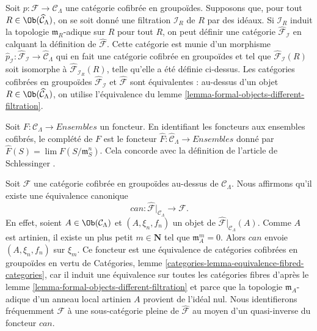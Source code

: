 \begin{remark}
\label{remark-different-sequence-ideals}
Soit $p : \mathcal{F} \to \mathcal{C}_\Lambda$ une catégorie cofibrée en
groupoïdes. Supposons que, pour tout
$R \in \Ob(\widehat{\mathcal{C}}_\Lambda)$, on se soit donné une filtration
$\mathcal{I}_R$ de $R$ par des idéaux. Si $\mathcal{I}_R$ induit la topologie
$\mathfrak m_R$-adique sur $R$ pour tout $R$, on peut définir une catégorie
$\widehat{\mathcal{F}}_\mathcal{I}$ en calquant la définition de
$\widehat{\mathcal{F}}$. Cette catégorie est munie d'un morphisme
$\widehat{p}_\mathcal{I} : \widehat{\mathcal{F}}_\mathcal{I} \to
\widehat{\mathcal{C}}_\Lambda$ qui en fait une catégorie cofibrée en
groupoïdes et tel que $\widehat{\mathcal{F}}_\mathcal{I}(R)$ soit isomorphe à
$\widehat{\mathcal{F}}_{\mathcal{I}_R}(R)$, telle qu'elle a été définie
ci-dessus. Les catégories cofibrées en groupoïdes
$\widehat{\mathcal{F}}_\mathcal{I}$ et $\widehat{\mathcal{F}}$ sont
équivalentes : au-dessus d'un objet
$R \in \Ob(\widehat{\mathcal{C}}_\Lambda)$, on utilise l'équivalence du
lemme \ref{lemma-formal-objects-different-filtration}.
\end{remark}

\begin{remark}
\label{remark-completion-functor}
Soit $F: \mathcal{C}_\Lambda \to \textit{Ensembles}$ un foncteur. En identifiant
les foncteurs aux ensembles cofibrés, le complété de $F$ est le foncteur
$\widehat{F} : \widehat{\mathcal{C}}_\Lambda \to \textit{Ensembles}$
donné par $\widehat{F}(S) = \lim F(S/\mathfrak{m}_S^{n})$. Cela concorde avec
la définition de l'article de Schlessinger \cite{Sch}.
\end{remark}

\begin{remark}
\label{remark-restrict-completion}
Soit $\mathcal{F}$ une catégorie cofibrée en groupoïdes au-dessus de
$\mathcal{C}_\Lambda$. Nous affirmons qu'il existe une équivalence canonique
$$
can :
\widehat{\mathcal{F}}|_{\mathcal{C}_\Lambda}
\longrightarrow
\mathcal{F}.
$$
En effet, soient $A \in \Ob(\mathcal{C}_\Lambda)$ et
$(A, \xi_n, f_n)$ un objet de
$\widehat{\mathcal{F}}|_{\mathcal{C}_\Lambda}(A)$. Comme $A$ est artinien,
il existe un plus petit $m \in \mathbf{N}$ tel que
$\mathfrak m_A^m = 0$. Alors $can$ envoie $(A, \xi_n, f_n)$ sur $\xi_m$.
Ce foncteur est une équivalence de catégories cofibrées en groupoïdes en
vertu de Catégories, lemme
\ref{categories-lemma-equivalence-fibred-categories}, car il induit une
équivalence sur toutes les catégories fibres d'après le lemme
\ref{lemma-formal-objects-different-filtration} et parce que la topologie
$\mathfrak m_A$-adique d'un anneau local artinien $A$ provient de l'idéal
nul. Nous identifierons fréquemment $\mathcal{F}$ à une sous-catégorie pleine
de $\widehat{\mathcal{F}}$ au moyen d'un quasi-inverse du foncteur $can$.
\end{remark}

